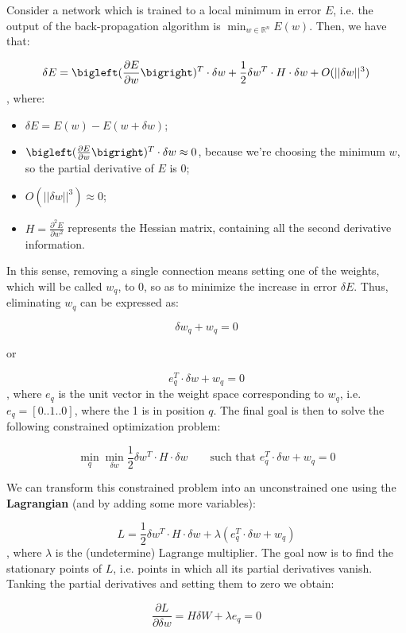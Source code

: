 Consider a network which is trained to a local minimum in error $E$, i.e. the output of the back-propagation algorithm is $\min_{w \in \mathbb{R}^n} E(w)$. Then, we have that:

$$
\delta E = \bigleft( \frac{\partial E}{\partial w} \bigright)^T \cdot \delta w + \frac{1}{2} \delta w^T \cdot H \cdot \delta w + O(||\delta w||^3)
$$
, where:

\begin{itemize}
    \item $\delta E = E(w) - E(w + \delta w)$;
    \item $\bigleft( \frac{\partial E}{\partial w} \bigright)^T \cdot \delta w \approx 0$, because we're choosing the minimum $w$, so the partial derivative of $E$ is 0;
    \item $  O(||\delta w||^3) \approx 0$;
    \item $H = \frac{\partial^2 E}{\partial w^2}$ represents the Hessian matrix, containing all the second derivative information.
\end{itemize}

In this sense, removing a single connection means setting one of the weights, which will be called $w_q$, to 0, so as to minimize the increase in error $\delta E$. Thus, eliminating $w_q$ can be expressed as:

$$
\delta w_q + w_q = 0
$$

or 

$$
e_q^T \cdot \delta w + w_q = 0
$$
, where $e_q$ is the unit vector in the weight space corresponding to $w_q$, i.e. $e_q = [0 .. 1 .. 0]$, where the 1 is in position $q$. The final goal is then to solve the following constrained optimization problem:

$$
\min_q \min_{\delta w} \frac{1}{2} \delta w^T \cdot H \cdot \delta w \qquad \text{such that } e_q^T \cdot \delta w + w_q = 0
$$

We can transform this constrained problem into an unconstrained one using the \textbf{Lagrangian} (and by adding some more variables):

$$
L = \frac{1}{2} \delta w^T \cdot H \cdot \delta w + \lambda (e_q^T \cdot \delta w + w_q)
$$
, where $\lambda$ is the (undetermine) Lagrange multiplier. The goal now is to find the stationary points of $L$, i.e. points in which all its partial derivatives vanish. Tanking the partial derivatives and setting them to zero we obtain:

$$
\frac{\partial L}{\partial \delta w} = H \delta W + \lambda e_q = 0
$$

